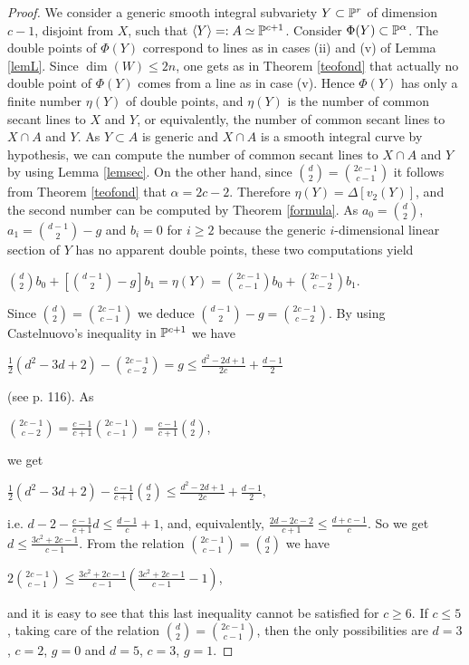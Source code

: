 \documentclass{amsart}
\theoremstyle{definition}
\begin{document}
\begin{proof}
We consider a generic smooth integral subvariety
$Y\subset\Bbb{P}^{r}$ of dimension $c-1$, disjoint from $X$, such
that $\langle Y\rangle  =:A\simeq\Bbb{P}^{c+1}$. Consider
$\Phi(Y)\subset\Bbb P^{\alpha}$. The double points of $\Phi(Y)$
correspond to lines as in cases (ii) and (v) of Lemma \ref{lemL}.
Since $\dim(W)\leq 2n$, one gets as in Theorem \ref{teofond} that
actually no double point of $\Phi(Y)$ comes from a line as in case
(v). Hence $\Phi(Y)$ has only a finite number $\eta(Y)$ of double
points, and $\eta(Y)$ is the number of common secant lines to $X$
and $Y$, or equivalently, the number of common secant lines to
$X\cap A$ and $Y$. As $Y\subset A$ is generic and $X\cap A$ is a
smooth integral curve by hypothesis, we can compute the number of
common secant lines to $X\cap A$ and $Y$ by using Lemma
\ref{lemsec}. On the other hand, since
$\binom{d}{2}=\binom{2c-1}{c-1}$ it follows from Theorem
\ref{teofond} that $\alpha=2c-2$. Therefore
$\eta(Y)=\Delta[v_2(Y)]$, and the second number can be computed by
Theorem \ref{formula}. As $a_0=\binom{d}{2}$, $a_1=\binom{d-1}{2}-g$
and $b_i=0$ for $i\geq 2$ because the generic $i$-dimensional linear
section of $Y$ has no apparent double points, these two computations
yield
\begin{center}
$\binom{d}{2}b_{0}+[\binom{d-1}{2}-g]b_{1}=\eta(Y)=\binom{2c-1}{c-1}b_0+\binom{2c-1}{c-2}b_1$.
\end{center}

Since $\binom{d}{2}=\binom{2c-1}{c-1}$ we deduce
$\binom{d-1}{2}-g=\binom{2c-1}{c-2}$. By using Castelnuovo's
inequality in $\Bbb{P}^{c+1}$ we have
\begin{center}
$\frac{1}{2}(d^{2}-3d+2)-\binom{2c-1}{c-2}=g \leq \frac{d^{2}-2d+1}{2c}+\frac{d-1}{2}$
\end{center}
(see \cite{acgh} p. 116). As
\begin{center}
$\binom{2c-1}{c-2}=\frac{c-1}{c+1}\binom{2c-1}{c-1}=\frac{c-1}{c+1}\binom{d}{2}$,
\end{center}
we get
\begin{center}
$\frac{1}{2}(d^{2}-3d+2)-\frac{c-1}{c+1}\binom{d}{2}\leq
\frac{d^{2}-2d+1}{2c}+\frac{d-1}{2},$
\end{center}
i.e. $d-2-\frac{c-1}{c+1}d\leq\frac{d-1}{c}+1$, and, equivalently,
$\frac{2d-2c-2}{c+1}\leq\frac{d+c-1}{c}$. So we get
$d\leq\frac{3c^2+2c-1}{c-1}$. From the relation
$\binom{2c-1}{c-1}=\binom{d}{2}$ we have
\begin{center}
$2\binom{2c-1}{c-1} \leq \frac{3c^2+2c-1}{c-1}(\frac{3c^2+2c-1}{c-1}-1)$,
\end{center}
and it is easy to see that this last inequality cannot be satisfied
for $c\geq 6$. If $c\leq 5$, taking care of the relation
$\binom{d}{2}=\binom{2c-1}{c-1}$, then the only possibilities are
$d=3$, $c=2$, $g=0$ and $d=5$, $c=3$, $g=1$.
\end{proof}
\end{document}
